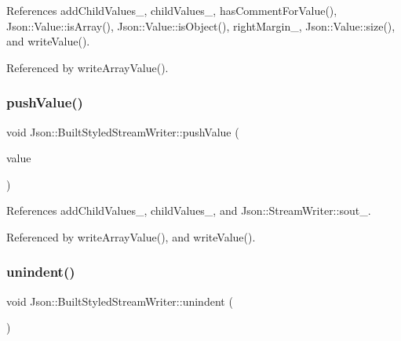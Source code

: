 References add\+Child\+Values\+\_\+, child\+Values\+\_\+, has\+Comment\+For\+Value(), Json\+::\+Value\+::is\+Array(), Json\+::\+Value\+::is\+Object(), right\+Margin\+\_\+, Json\+::\+Value\+::size(), and write\+Value().



Referenced by write\+Array\+Value().

\mbox{\label{structJson_1_1BuiltStyledStreamWriter_a91e8535508412eea04d77c0cafdf15aa_a91e8535508412eea04d77c0cafdf15aa}} 
\subsubsection{\texorpdfstring{push\+Value()}{pushValue()}}
{\footnotesize\ttfamily void Json\+::\+Built\+Styled\+Stream\+Writer\+::push\+Value (\begin{DoxyParamCaption}\item[{\hyperlink{json_8h_a1e723f95759de062585bc4a8fd3fa4be_a1e723f95759de062585bc4a8fd3fa4be}{J\+S\+O\+N\+C\+P\+P\+\_\+\+S\+T\+R\+I\+NG} const \&}]{value }\end{DoxyParamCaption})\hspace{0.3cm}{\ttfamily [private]}}



References add\+Child\+Values\+\_\+, child\+Values\+\_\+, and Json\+::\+Stream\+Writer\+::sout\+\_\+.



Referenced by write\+Array\+Value(), and write\+Value().

\mbox{\label{structJson_1_1BuiltStyledStreamWriter_a0da6c6f603e00c8c6e38af553edd8c55_a0da6c6f603e00c8c6e38af553edd8c55}} 
\subsubsection{\texorpdfstring{unindent()}{unindent()}}
{\footnotesize\ttfamily void Json\+::\+Built\+Styled\+Stream\+Writer\+::unindent (\begin{DoxyParamCaption}{ }\end{DoxyParamCaption})\hspace{0.3cm}{\ttfamily [private]}}



